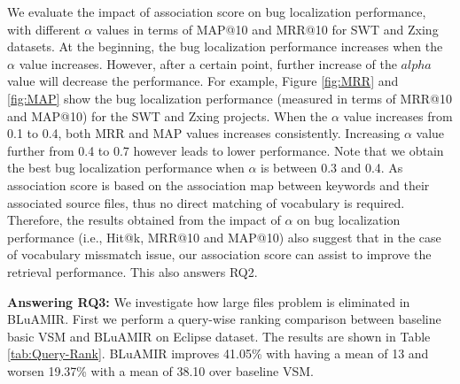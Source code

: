 \documentclass[conference]{IEEEtran}
\begin{document}
We evaluate the impact of association score
on bug localization performance, with different $\alpha$ values in terms of MAP@10 and MRR@10 for SWT and Zxing datasets. At the beginning, the bug localization performance increases when the $\alpha$ value increases. However, after a certain point, further increase of the $alpha$ value will decrease the performance. For example, Figure \ref{fig:MRR} and \ref{fig:MAP} show the bug localization performance (measured in terms of MRR@10 and MAP@10) for the SWT and Zxing projects. When the $\alpha$ value increases from 0.1 to 0.4, both MRR and MAP values increases consistently. Increasing $\alpha$ value further from 0.4 to 0.7 however leads to lower performance. Note that we obtain the best bug localization performance when $\alpha$ is between 0.3 and 0.4. As association score is based on the association map between keywords and their associated source files, thus no direct matching of vocabulary is required. Therefore, the results obtained from the impact of $\alpha$ on bug localization performance (i.e., Hit@k, MRR@10 and MAP@10) also suggest that in the case of vocabulary missmatch issue, our association score can assist to improve the retrieval performance. This also answers RQ2.









\textbf{Answering RQ3:} \label{answerRQ3}
We investigate how large files problem is eliminated in BLuAMIR. First we perform a query-wise ranking comparison between baseline basic VSM and BLuAMIR on Eclipse dataset. The results are shown in Table \ref{tab:Query-Rank}.
BLuAMIR improves 41.05\% with having a mean of 13 and worsen 19.37\% with a mean of 38.10 over baseline VSM. 
\end{document}
